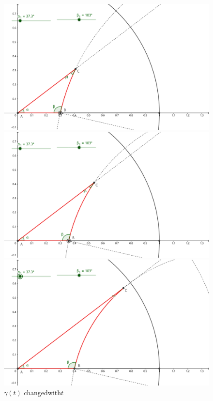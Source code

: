 \documentclass{article}
\begin{document}
\begin{figure}[htbp]
\begin{minipage}{0.25\linewidth}
        \caption*{$t=0.15$}
    \end{minipage}
    \begin{minipage}{0.25\linewidth}
        \centering
        \includegraphics[width={0.9\linewidth}]{B3.png}
        \caption*{$t=0.3$}
    \end{minipage}
    \begin{minipage}{0.25\linewidth}
        \centering
        \includegraphics[width={0.9\linewidth}]{B2.png}
        \caption*{$t=0.37$}
    \end{minipage}
    \begin{minipage}{0.25\linewidth}
        \centering
        \includegraphics[width={0.9\linewidth}]{B1.png}
        \caption*{$t=0.4$}
    \end{minipage}
    \caption{$\gamma(t)$ changed\quad with\quad $t$}
    \label{gamma}
\end{figure}
\end{document}
